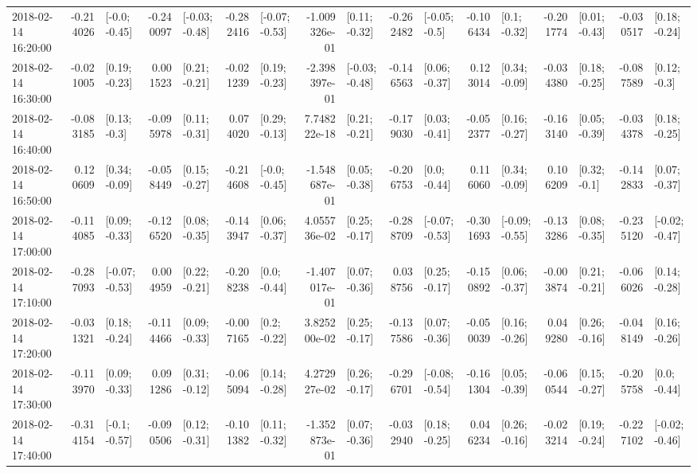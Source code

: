 \begin{tabular}{lrlrlrlrlrlrlrlrl}
2018-02-14 16:20:00 & -0.214026 &   [-0.0; -0.45] & -0.240097 &  [-0.03; -0.48] & -0.282416 &  [-0.07; -0.53] & -1.009326e-01 &   [0.11; -0.32] & -0.262482 &   [-0.05; -0.5] & -0.106434 &    [0.1; -0.32] & -0.201774 &   [0.01; -0.43] & -0.030517 &   [0.18; -0.24] \\
2018-02-14 16:30:00 & -0.021005 &   [0.19; -0.23] &  0.001523 &   [0.21; -0.21] & -0.021239 &   [0.19; -0.23] & -2.398397e-01 &  [-0.03; -0.48] & -0.146563 &   [0.06; -0.37] &  0.123014 &   [0.34; -0.09] & -0.034380 &   [0.18; -0.25] & -0.087589 &    [0.12; -0.3] \\
2018-02-14 16:40:00 & -0.083185 &    [0.13; -0.3] & -0.095978 &   [0.11; -0.31] &  0.074020 &   [0.29; -0.13] &  7.748222e-18 &   [0.21; -0.21] & -0.179030 &   [0.03; -0.41] & -0.052377 &   [0.16; -0.27] & -0.163140 &   [0.05; -0.39] & -0.034378 &   [0.18; -0.25] \\
2018-02-14 16:50:00 &  0.120609 &   [0.34; -0.09] & -0.058449 &   [0.15; -0.27] & -0.214608 &   [-0.0; -0.45] & -1.548687e-01 &   [0.05; -0.38] & -0.206753 &    [0.0; -0.44] &  0.116060 &   [0.34; -0.09] &  0.106209 &    [0.32; -0.1] & -0.142833 &   [0.07; -0.37] \\
2018-02-14 17:00:00 & -0.114085 &   [0.09; -0.33] & -0.126520 &   [0.08; -0.35] & -0.143947 &   [0.06; -0.37] &  4.055736e-02 &   [0.25; -0.17] & -0.288709 &  [-0.07; -0.53] & -0.301693 &  [-0.09; -0.55] & -0.133286 &   [0.08; -0.35] & -0.235120 &  [-0.02; -0.47] \\
2018-02-14 17:10:00 & -0.287093 &  [-0.07; -0.53] &  0.004959 &   [0.22; -0.21] & -0.208238 &    [0.0; -0.44] & -1.407017e-01 &   [0.07; -0.36] &  0.038756 &   [0.25; -0.17] & -0.150892 &   [0.06; -0.37] & -0.003874 &   [0.21; -0.21] & -0.066026 &   [0.14; -0.28] \\
2018-02-14 17:20:00 & -0.031321 &   [0.18; -0.24] & -0.114466 &   [0.09; -0.33] & -0.007165 &    [0.2; -0.22] &  3.825200e-02 &   [0.25; -0.17] & -0.137586 &   [0.07; -0.36] & -0.050039 &   [0.16; -0.26] &  0.049280 &   [0.26; -0.16] & -0.048149 &   [0.16; -0.26] \\
2018-02-14 17:30:00 & -0.113970 &   [0.09; -0.33] &  0.091286 &   [0.31; -0.12] & -0.065094 &   [0.14; -0.28] &  4.272927e-02 &   [0.26; -0.17] & -0.296701 &  [-0.08; -0.54] & -0.161304 &   [0.05; -0.39] & -0.060544 &   [0.15; -0.27] & -0.205758 &    [0.0; -0.44] \\
2018-02-14 17:40:00 & -0.314154 &   [-0.1; -0.57] & -0.090506 &   [0.12; -0.31] & -0.101382 &   [0.11; -0.32] & -1.352873e-01 &   [0.07; -0.36] & -0.032940 &   [0.18; -0.25] &  0.046234 &   [0.26; -0.16] & -0.023214 &   [0.19; -0.24] & -0.227102 &  [-0.02; -0.46] \\

\end{tabular}
